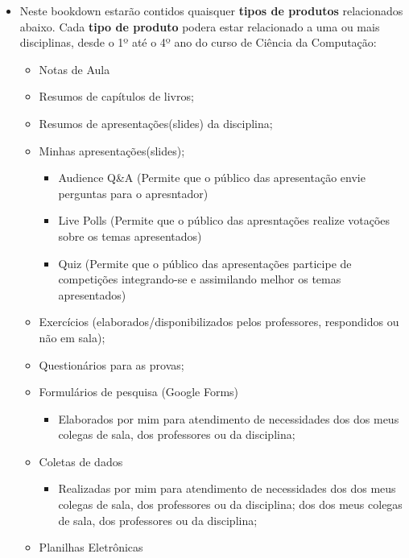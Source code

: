 \documentclass[
]{book}
\providecommand{\tightlist}{%
  \setlength{\itemsep}{0pt}\setlength{\parskip}{0pt}}
\begin{document}
\begin{itemize}
\tightlist
\item
  Neste bookdown estarão contidos quaisquer \textbf{tipos de produtos} relacionados abaixo. Cada \textbf{tipo de produto} podera estar relacionado a uma ou mais disciplinas, desde o 1º até o 4º ano do curso de Ciência da Computação:

  \begin{itemize}
  \tightlist
  \item
    Notas de Aula
  \item
    Resumos de capítulos de livros;
  \item
    Resumos de apresentações(slides) da disciplina;
  \item
    Minhas apresentações(slides);

    \begin{itemize}
    \tightlist
    \item
      Audience Q\&A (Permite que o público das apresentação envie perguntas para o apresntador)
    \item
      Live Polls (Permite que o público das apresntações realize votações sobre os temas apresentados)
    \item
      Quiz (Permite que o público das apresentações participe de competições integrando-se e assimilando melhor os temas apresentados)
    \end{itemize}
  \item
    Exercícios (elaborados/disponibilizados pelos professores, respondidos ou não em sala);
  \item
    Questionários para as provas;
  \item
    Formulários de pesquisa (Google Forms)

    \begin{itemize}
    \tightlist
    \item
      Elaborados por mim para atendimento de necessidades dos dos meus colegas de sala, dos professores ou da disciplina;
    \end{itemize}
  \item
    Coletas de dados

    \begin{itemize}
    \tightlist
    \item
      Realizadas por mim para atendimento de necessidades dos dos meus colegas de sala, dos professores ou da disciplina; dos dos meus colegas de sala, dos professores ou da disciplina;
    \end{itemize}
  \item
    Planilhas Eletrônicas


\end{itemize}
\end{itemize}
\end{document}
